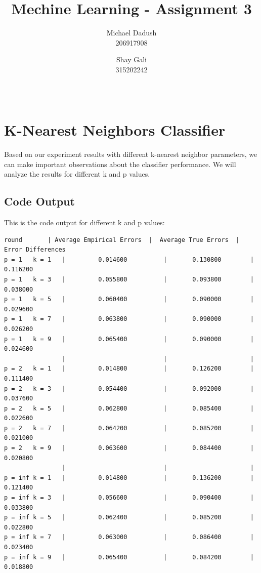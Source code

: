 \documentclass{article}
\title{Mechine Learning - Assignment 3}
\author{Michael Dadush \\ 206917908 \and Shay Gali \\ 315202242}
\date{\monthname[\month] \ \the\year}
\begin{document}
\maketitle

\section{K-Nearest Neighbors Classifier}

Based on our experiment results with different k-nearest neighbor parameters, we can make important observations about the classifier performance. We will analyze the results for different k and p values.


\subsection{Code Output}
This is the code output for different k and p values:
\begin{Verbatim}[fontsize=\small, xleftmargin=0pt, xrightmargin=0pt]
    round       | Average Empirical Errors  |  Average True Errors  |  Error Differences
p = 1   k = 1   |         0.014600          |       0.130800        |      0.116200
p = 1   k = 3   |         0.055800          |       0.093800        |      0.038000
p = 1   k = 5   |         0.060400          |       0.090000        |      0.029600
p = 1   k = 7   |         0.063800          |       0.090000        |      0.026200
p = 1   k = 9   |         0.065400          |       0.090000        |      0.024600
                |                           |                       |
p = 2   k = 1   |         0.014800          |       0.126200        |      0.111400
p = 2   k = 3   |         0.054400          |       0.092000        |      0.037600
p = 2   k = 5   |         0.062800          |       0.085400        |      0.022600
p = 2   k = 7   |         0.064200          |       0.085200        |      0.021000
p = 2   k = 9   |         0.063600          |       0.084400        |      0.020800
                |                           |                       |
p = inf k = 1   |         0.014800          |       0.136200        |      0.121400
p = inf k = 3   |         0.056600          |       0.090400        |      0.033800
p = inf k = 5   |         0.062400          |       0.085200        |      0.022800
p = inf k = 7   |         0.063000          |       0.086400        |      0.023400
p = inf k = 9   |         0.065400          |       0.084200        |      0.018800
\end{Verbatim}
\end{document}
